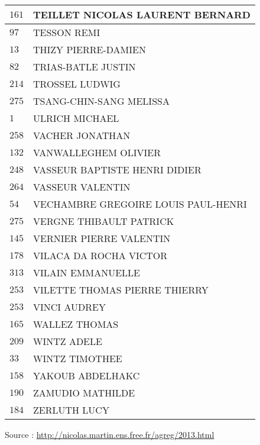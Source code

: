\begin{xltabular}{\linewidth}{|l|X|}
    \hline
    $161$ & TEILLET NICOLAS LAURENT BERNARD \\
    \hline
    $97$ & TESSON REMI \\
    \hline
    $13$ & THIZY PIERRE-DAMIEN \\
    \hline
    $82$ & TRIAS-BATLE JUSTIN \\
    \hline
    $214$ & TROSSEL LUDWIG \\
    \hline
    $275$ & TSANG-CHIN-SANG MELISSA \\
    \hline
    $1$ & ULRICH MICHAEL \\
    \hline
    $258$ & VACHER JONATHAN \\
    \hline
    $132$ & VANWALLEGHEM OLIVIER \\
    \hline
    $248$ & VASSEUR BAPTISTE HENRI DIDIER \\
    \hline
    $264$ & VASSEUR VALENTIN \\
    \hline
    $54$ & VECHAMBRE GREGOIRE LOUIS PAUL-HENRI \\
    \hline
    $275$ & VERGNE THIBAULT PATRICK \\
    \hline
    $145$ & VERNIER PIERRE VALENTIN \\
    \hline
    $178$ & VILACA DA ROCHA VICTOR \\
    \hline
    $313$ & VILAIN EMMANUELLE \\
    \hline
    $253$ & VILETTE THOMAS PIERRE THIERRY \\
    \hline
    $253$ & VINCI AUDREY \\
    \hline
    $165$ & WALLEZ THOMAS \\
    \hline
    $209$ & WINTZ ADELE \\
    \hline
    $33$ & WINTZ TIMOTHEE \\
    \hline
    $158$ & YAKOUB ABDELHAKC \\
    \hline
    $190$ & ZAMUDIO MATHILDE \\
    \hline
    $184$ & ZERLUTH LUCY \\
    \hline
  \end{xltabular}

  \begin{flushright}
    {\tiny Source : \url{http://nicolas.martin.ens.free.fr/agreg/2013.html}}
  \end{flushright}

